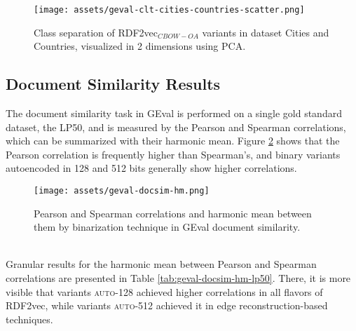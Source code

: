 \documentclass[11pt,titlepage,oneside,openany]{book}
\begin{document}
\begin{figure}[h!]
    \centering
    \centerline{\texttt{[image: assets/geval-clt-cities-countries-scatter.png]}}
    \vspace*{-3mm}
    \caption{Class separation of RDF2vec$_{CBOW-OA}$ variants in dataset Cities and Countries, visualized in 2 dimensions using PCA.}
    \label{fig:geval-clt-cities-countries-scatter}
\end{figure}


\subsection{Document Similarity Results}
\label{subsec:geval-doc-sim}

The document similarity task in GEval is performed on a single gold standard dataset, the LP50, and is measured by the Pearson and Spearman correlations, which can be summarized with their harmonic mean. Figure \ref{fig:geval-docsim-hm} shows that the Pearson correlation is frequently higher than Spearman's, and binary variants autoencoded in 128 and 512 bits generally show higher correlations.\\
\begin{figure}[h!]
    \centering
    \centerline{\texttt{[image: assets/geval-docsim-hm.png]}}
    \caption{Pearson and Spearman correlations and harmonic mean between them by binarization technique in GEval document similarity.}
    \label{fig:geval-docsim-hm}
\end{figure}
\\
Granular results for the harmonic mean between Pearson and Spearman correlations are presented in Table \ref{tab:geval-docsim-hm-lp50}. There, it is more visible that variants \textsc{auto-128} achieved higher correlations in all flavors of RDF2vec, while variants \textsc{auto-512} achieved it in edge reconstruction-based techniques.\\
\end{document}
